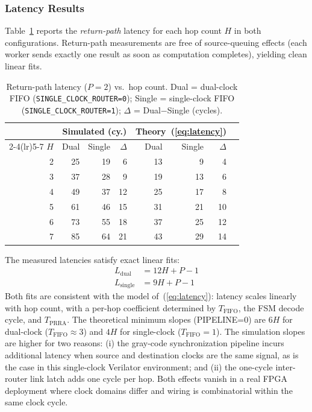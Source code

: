 \subsubsection{Latency Results}

Table~\ref{tab:latency} reports the \emph{return-path} latency for each hop
count $H$ in both configurations.  Return-path measurements are free of
source-queuing effects (each worker sends exactly one result as soon as
computation completes), yielding clean linear fits.

\begin{table}[h]
\centering
\footnotesize
\setlength{\tabcolsep}{4pt}
\caption{Return-path latency ($P=2$) vs.\ hop count.
         Dual = dual-clock FIFO (\texttt{SINGLE\_CLOCK\_ROUTER=0});
         Single = single-clock FIFO (\texttt{SINGLE\_CLOCK\_ROUTER=1});
         $\Delta$ = Dual$-$Single (cycles).}
\label{tab:latency}
\begin{tabular}{@{}rrrrrrrr@{}}
\toprule
 & \multicolumn{3}{c}{Simulated (cy.)} & \multicolumn{3}{c}{Theory~(\ref{eq:latency})} \\
\cmidrule(lr){2-4}\cmidrule(lr){5-7}
$H$ & Dual & Single & $\Delta$ & Dual & Single & $\Delta$ \\
\midrule
2 & 25 & 19 &  6 & 13 &  9 &  4 \\
3 & 37 & 28 &  9 & 19 & 13 &  6 \\
4 & 49 & 37 & 12 & 25 & 17 &  8 \\
5 & 61 & 46 & 15 & 31 & 21 & 10 \\
6 & 73 & 55 & 18 & 37 & 25 & 12 \\
7 & 85 & 64 & 21 & 43 & 29 & 14 \\
\bottomrule
\end{tabular}
\end{table}

The measured latencies satisfy exact linear fits:
\begin{align}
  L_\text{dual}   &= 12H + P - 1 \label{eq:lfit-dual}   \\
  L_\text{single} &= 9H + P - 1  \label{eq:lfit-single}
\end{align}
Both fits are consistent with the model of~(\ref{eq:latency}): latency scales
linearly with hop count, with a per-hop coefficient determined by
$T_\text{FIFO}$, the FSM decode cycle, and $T_\text{PRRA}$.
The theoretical minimum slopes (PIPELINE=0) are $6H$ for dual-clock
($T_\text{FIFO}\approx3$) and $4H$ for single-clock ($T_\text{FIFO}=1$).
The simulation slopes are higher for two reasons: (i) the gray-code
synchronization pipeline incurs additional latency when source and destination
clocks are the same signal, as is the case in this single-clock Verilator
environment; and (ii) the one-cycle inter-router link latch adds one cycle per
hop.  Both effects vanish in a real FPGA deployment where clock domains differ
and wiring is combinatorial within the same clock cycle.

